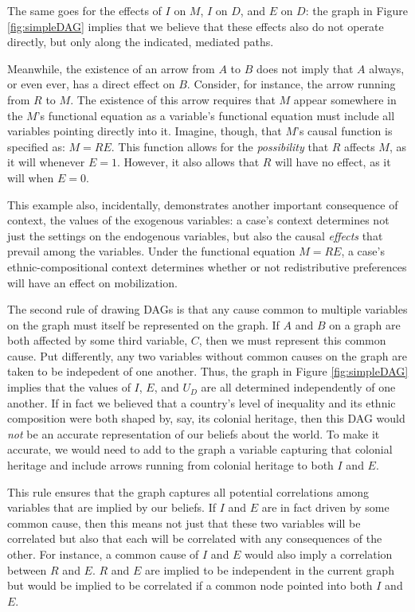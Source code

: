 \documentclass[12pt,]{book}
\begin{document}
The same goes for the effects of \(I\) on \(M\), \(I\) on \(D\), and \(E\) on \(D\): the graph in Figure \ref{fig:simpleDAG} implies that we believe that these effects also do not operate directly, but only along the indicated, mediated paths.

Meanwhile, the existence of an arrow from \(A\) to \(B\) does not imply that \(A\) always, or even ever, has a direct effect on \(B\). Consider, for instance, the arrow running from \(R\) to \(M\). The existence of this arrow requires that \(M\) appear somewhere in the \(M\)'s functional equation as a variable's functional equation must include all variables pointing directly into it. Imagine, though, that \(M\)'s causal function is specified as: \(M = RE\). This function allows for the \emph{possibility} that \(R\) affects \(M\), as it will whenever \(E=1\). However, it also allows that \(R\) will have no effect, as it will when \(E=0\).

This example also, incidentally, demonstrates another important consequence of context, the values of the exogenous variables: a case's context determines not just the settings on the endogenous variables, but also the causal \emph{effects} that prevail among the variables. Under the functional equation \(M=RE\), a case's ethnic-compositional context determines whether or not redistributive preferences will have an effect on mobilization.

The second rule of drawing DAGs is that any cause common to multiple variables on the graph must itself be represented on the graph. If \(A\) and \(B\) on a graph are both affected by some third variable, \(C\), then we must represent this common cause. Put differently, any two variables without common causes on the graph are taken to be indepedent of one another. Thus, the graph in Figure \ref{fig:simpleDAG} implies that the values of \(I\), \(E\), and \(U_D\) are all determined independently of one another. If in fact we believed that a country's level of inequality and its ethnic composition were both shaped by, say, its colonial heritage, then this DAG would \emph{not} be an accurate representation of our beliefs about the world. To make it accurate, we would need to add to the graph a variable capturing that colonial heritage and include arrows running from colonial heritage to both \(I\) and \(E\).

This rule ensures that the graph captures all potential correlations among variables that are implied by our beliefs. If \(I\) and \(E\) are in fact driven by some common cause, then this means not just that these two variables will be correlated but also that each will be correlated with any consequences of the other. For instance, a common cause of \(I\) and \(E\) would also imply a correlation between \(R\) and \(E\). \(R\) and \(E\) are implied to be independent in the current graph but would be implied to be correlated if a common node pointed into both \(I\) and \(E\).
\end{document}
